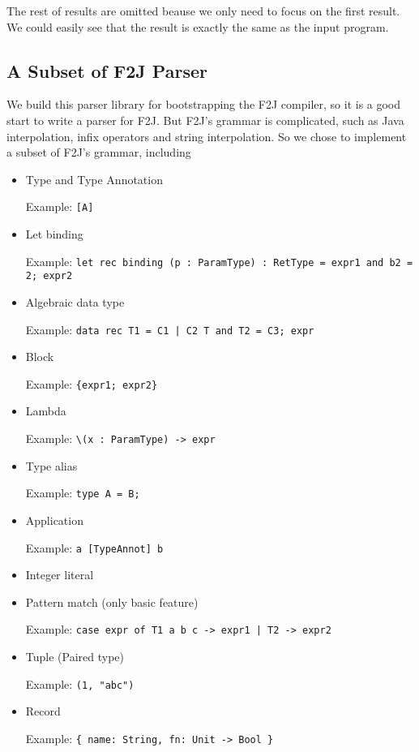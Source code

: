 The rest of results are omitted beause we only need to focus on the first result. We could easily see that the result is exactly the same as the input program.

\subsection{A Subset of F2J Parser}

We build this parser library for bootstrapping the F2J compiler, so it is a good start to write a parser for F2J. But F2J's grammar is complicated, such as Java interpolation, infix operators and string interpolation. So we chose to implement a subset of F2J's grammar, including

\begin{itemize}
\item Type and Type Annotation

Example: \texttt{[A]}

\item Let binding

Example: \texttt{let rec binding (p : ParamType) : RetType = expr1 and b2 = 2; expr2}

\item Algebraic data type

Example: \texttt{data rec T1 = C1 | C2 T and T2 = C3; expr}

\item Block

Example: \texttt{\{expr1; expr2\}}

\item Lambda

Example: \texttt{\textbackslash (x : ParamType) -> expr}

\item Type alias

Example: \texttt{type A = B;}

\item Application

Example: \texttt{a [TypeAnnot] b}

\item Integer literal
\item Pattern match (only basic feature)

Example: \texttt{case expr of T1 a b c -> expr1 | T2 -> expr2}

\item Tuple (Paired type)

Example: \texttt{(1, "abc")}

\item Record

Example: \texttt{\{ name: String, fn: Unit -> Bool \}}

\end{itemize}


